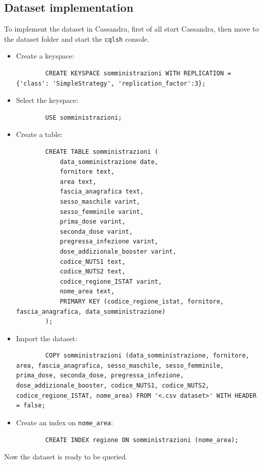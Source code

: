 \documentclass{article}
\begin{document}
\subsection{Dataset implementation}
To implement the dataset in Cassandra, first of all start Cassandra, then move to the dataset folder and start the \verb|cqlsh| console.
\begin{itemize}
    \item Create a keyspace: 
        \begin{lstlisting}
        CREATE KEYSPACE somministrazioni WITH REPLICATION = {'class': 'SimpleStrategy', 'replication_factor':3};
        \end{lstlisting}
    \item Select the keyspace: 
        \begin{lstlisting}
        USE somministrazioni;
        \end{lstlisting}
    \item Create a table: 
        \begin{lstlisting}
        CREATE TABLE somministrazioni (  
            data_somministrazione date,
            fornitore text,
            area text,
            fascia_anagrafica text,
            sesso_maschile varint,
            sesso_femminile varint,
            prima_dose varint,
            seconda_dose varint,
            pregressa_infezione varint,
            dose_addizionale_booster varint,
            codice_NUTS1 text,
            codice_NUTS2 text,
            codice_regione_ISTAT varint,
            nome_area text,
            PRIMARY KEY (codice_regione_istat, fornitore, fascia_anagrafica, data_somministrazione)
        );
        \end{lstlisting}
    \item Import the dataset: 
        \begin{lstlisting}
        COPY somministrazioni (data_somministrazione, fornitore, area, fascia_anagrafica, sesso_maschile, sesso_femminile, prima_dose, seconda_dose, pregressa_infezione, dose_addizionale_booster, codice_NUTS1, codice_NUTS2, codice_regione_ISTAT, nome_area) FROM '<.csv dataset>' WITH HEADER = false;
        \end{lstlisting}
    \item Create an index on \verb|nome_area|: 
        \begin{lstlisting}
        CREATE INDEX regione ON somministrazioni (nome_area);
        \end{lstlisting}
\end{itemize}
Now the dataset is ready to be queried.
\end{document}
